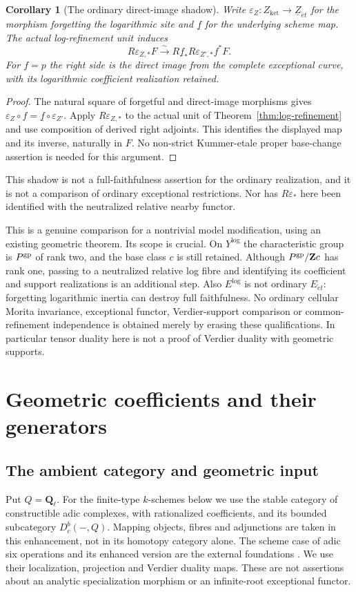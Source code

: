 \documentclass[11pt]{article}
\newtheorem{corollary}[theorem]{Corollary}
\theoremstyle{definition}
\theoremstyle{remark}
\begin{document}
\begin{corollary}[The ordinary direct-image shadow]
\label{cor:log-ordinary-shadow}
Write $\varepsilon_Z:Z_{\mathrm{ket}}\to\underline Z_{\acute et}$
for the morphism forgetting the logarithmic site and $\underline f$
for the underlying scheme map.  The actual log-refinement unit induces
\[
 R\varepsilon_{Z,*}F\xrightarrow{\sim}
 R\underline f_*R\varepsilon_{Z',*}f^*F.
\]
For $f=p$ the right side is the direct image from the complete exceptional
curve, with its logarithmic coefficient realization retained.
\end{corollary}
\begin{proof}
The natural square of forgetful and direct-image morphisms gives
$\varepsilon_Z\circ f=\underline f\circ\varepsilon_{Z'}$.
Apply $R\varepsilon_{Z,*}$ to the actual unit of
Theorem~\ref{thm:log-refinement} and use composition of derived right
adjoints.  This identifies the displayed map and its inverse, naturally
in $F$.  No non-strict Kummer-etale proper base-change assertion is
needed for this argument.
\end{proof}
This shadow is not a full-faithfulness assertion for the ordinary
realization, and it is not a comparison of ordinary exceptional
restrictions.  Nor has $R\varepsilon_*$ here been identified with the
neutralized relative nearby functor.

This is a genuine comparison for a nontrivial model modification, using
an existing geometric theorem.  Its scope is crucial.  On $Y^{\log}$
the characteristic group is $P^{\rm gp}$ of rank two, and the base
class $c$ is still retained.  Although $P^{\rm gp}/\mathbf Zc$ has
rank one, passing to a neutralized relative log fibre and identifying
its coefficient and support realizations is an additional step.
Also $E^{\log}$ is not ordinary $E_{\acute et}$: forgetting logarithmic
inertia can destroy full faithfulness.  No ordinary cellular Morita
invariance, exceptional functor, Verdier-support comparison or
common-refinement independence is obtained merely by erasing these
qualifications.  In particular tensor duality here is not a proof of
Verdier duality with geometric supports.

\section{Geometric coefficients and their generators}
\subsection{The ambient category and geometric input}
Put $Q=\mathbf Q_\ell$.  For the finite-type $k$-schemes below we use the
stable category of constructible adic complexes, with rationalized
coefficients, and its bounded subcategory $D_c^b(-,Q)$.  Mapping objects,
fibres and adjunctions are taken in this enhancement, not in its homotopy
category alone.  The scheme case of adic six operations and its enhanced
version are the external foundations \cite{LOAdic,LZEnhanced}.
We use their localization, projection and Verdier duality maps.  These
are not assertions about an analytic specialization morphism or an
infinite-root exceptional functor.
\end{document}
